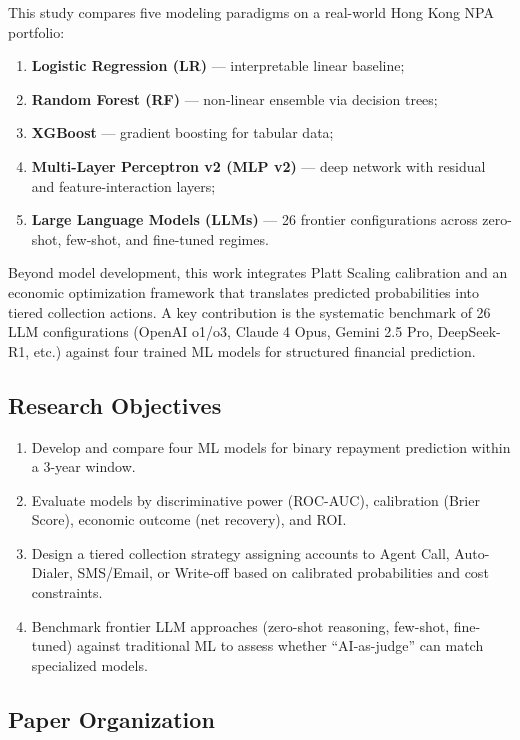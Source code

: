 \documentclass[11pt, a4paper]{article}
\begin{document}
This study compares five modeling paradigms on a real-world Hong Kong NPA portfolio:
\begin{enumerate}[leftmargin=*, nosep]
    \item \textbf{Logistic Regression (LR)} --- interpretable linear baseline;
    \item \textbf{Random Forest (RF)} --- non-linear ensemble via decision trees;
    \item \textbf{XGBoost} --- gradient boosting for tabular data;
    \item \textbf{Multi-Layer Perceptron v2 (MLP v2)} --- deep network with residual and feature-interaction layers;
    \item \textbf{Large Language Models (LLMs)} --- 26 frontier configurations across zero-shot, few-shot, and fine-tuned regimes.
\end{enumerate}
Beyond model development, this work integrates Platt Scaling calibration and an economic optimization framework that translates predicted probabilities into tiered collection actions. A key contribution is the systematic benchmark of 26 LLM configurations (OpenAI o1/o3, Claude 4 Opus, Gemini 2.5 Pro, DeepSeek-R1, etc.) against four trained ML models for structured financial prediction.

\subsection{Research Objectives}

\begin{enumerate}[label=(O\arabic*), nosep]
    \item Develop and compare four ML models for binary repayment prediction within a 3-year window.
    \item Evaluate models by discriminative power (ROC-AUC), calibration (Brier Score), economic outcome (net recovery), and ROI.
    \item Design a tiered collection strategy assigning accounts to Agent Call, Auto-Dialer, SMS/Email, or Write-off based on calibrated probabilities and cost constraints.
    \item Benchmark frontier LLM approaches (zero-shot reasoning, few-shot, fine-tuned) against traditional ML to assess whether ``AI-as-judge'' can match specialized models.
\end{enumerate}

\subsection{Paper Organization}
\end{document}

